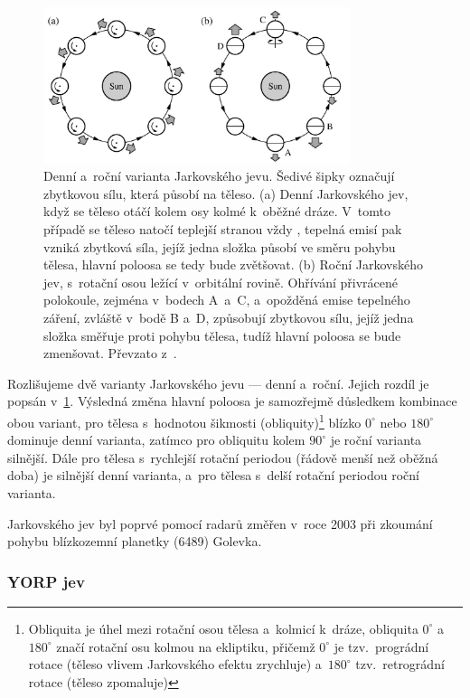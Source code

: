 \documentclass[A4paper, 12pt, oneside]{book}
\begin{document}
\begin{figure} 
	\centering

		\includegraphics[width=0.8\textwidth]{obr/jarkovskeho_jev.png}
	\caption{Denní a~roční varianta Jarkovského jevu. Šedivé šipky
	označují zbytkovou sílu, která působí na těleso. (a) Denní Jarkovského jev, když se těleso otáčí kolem osy kolmé k~oběžné dráze. V~tomto případě se těleso natočí teplejší stranou vždy , tepelná emisí pak vzniká zbytková síla, jejíž jedna složka působí ve směru pohybu tělesa, hlavní poloosa se tedy bude zvětšovat. (b) Roční Jarkovského jev, s~rotační osou ležící v~orbitální rovině. Ohřívání přivrácené polokoule, zejména v~bodech A~a~C, a~opožděná emise tepelného záření, zvláště v~bodě B a~D, způsobují zbytkovou sílu, jejíž jedna složka směřuje proti pohybu tělesa, tudíž hlavní poloosa se bude zmenšovat. Převzato z~\cite{fmt}.} \label{fig:jarko}
\end{figure}

Rozlišujeme dvě varianty Jarkovského jevu --- denní a~roční. Jejich rozdíl je popsán v~\ref{fig:jarko}. Výsledná změna hlavní poloosa je samozřejmě důsledkem kombinace obou variant, pro tělesa s~hodnotou šikmosti (obliquity)\footnote{Obliquita je úhel mezi rotační osou tělesa a~kolmicí k~dráze, obliquita $0^\circ$ a~$180^\circ$ značí rotační osu kolmou na ekliptiku, přičemž $0^\circ$ je tzv.\ prográdní rotace (těleso vlivem Jarkovského efektu zrychluje) a~$180^\circ$ tzv.\ retrográdní rotace (těleso zpomaluje)} blízko $0^\circ$ nebo $180^\circ$ dominuje denní varianta, zatímco pro obliquitu kolem $90^\circ$ je roční varianta silnější. Dále pro tělesa s~rychlejší rotační periodou (řádově menší než oběžná doba) je silnější denní varianta, a~pro tělesa s~delší rotační periodou roční varianta. 

Jarkovského jev byl poprvé pomocí radarů změřen v~roce 2003 při zkoumání pohybu blízkozemní planetky (6489) Golevka.~\cite{chesley03}
\subsubsection{YORP jev}
\end{document}
